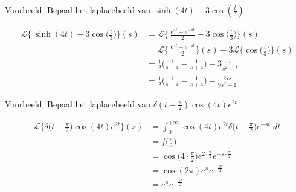 \documentclass[12pt]{report}
\newcommand{\example}[2]{
    \hrulefill
    
    Voorbeeld: #1
    
    #2
    
    \hrulefill
}
\begin{document}
\example{Bepaal het laplacebeeld van $\sinh(4t) - 3\cos{(\frac{t}{3})}$}
{
\begin{equation*}
\begin{split}
\mathcal{L}\bigg\{\ \sinh(4t) - 3\cos{\bigg(\frac{t}{3}\bigg)} \bigg\}(s) & = \mathcal{L}\bigg\{\ \frac{e^{4t} - e^{-4t}}{2} - 3\cos{\bigg(\frac{t}{3}\bigg)} \bigg\}(s) \\
& = \mathcal{L}\bigg\{\ \frac{e^{4t} - e^{-4t}}{2}\bigg\}(s) - 3\mathcal{L}\bigg\{\cos{\bigg(\frac{t}{3}\bigg)} \bigg\}(s) \\
& = \frac{1}{2}\bigg(\frac{1}{s - 4} - \frac{1}{s + 4}\bigg) - 3\frac{s}{s^2 + \frac{1}{9}} \\
& = \frac{1}{2}\bigg(\frac{1}{s - 4} - \frac{1}{s + 4}\bigg) - \frac{27s}{9s^2 + 1}
\end{split}
\end{equation*}
}
\example{Bepaal het laplacebeeld van $\delta(t - \frac{\pi}{2})\cos(4t)e^{2t}$}{
\begin{equation*}
\begin{split}
\mathcal{L}\bigg\{\delta\bigg(t - \frac{\pi}{2}\bigg)\cos(4t)e^{2t}\bigg\}(s) & = \int_{0}^{+\infty}\cos(4t)e^{2t}\delta\bigg(t - \frac{\pi}{2}\bigg)e^{-st} \; dt \\
& = f\bigg(\frac{\pi}{2}\bigg) \\
& = \cos\bigg(4 \cdot \frac{\pi}{2}\bigg)e^{2\cdot\frac{\pi}{2}}e^{-s\cdot\frac{\pi}{2}} \\
& = \cos(2\pi)e^{\pi}e^{-\frac{s\pi}{2}}\\
& = e^{\pi}e^{-\frac{s\pi}{2}}
\end{split}
\end{equation*}

}
\end{document}
